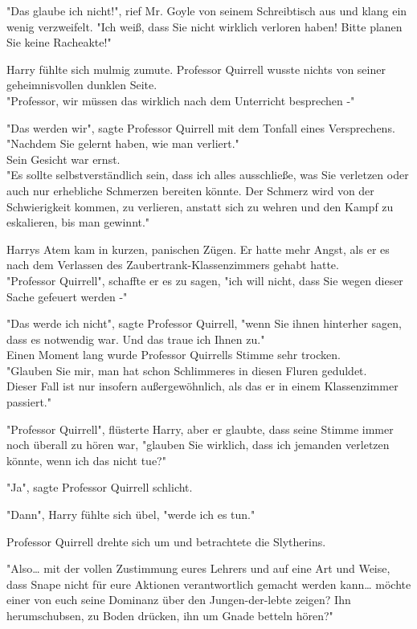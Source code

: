 {"Das glaube ich nicht!", rief Mr. Goyle von seinem Schreibtisch aus und klang ein wenig verzweifelt. "Ich weiß, dass Sie nicht wirklich verloren haben! Bitte planen Sie keine Racheakte!"

Harry fühlte sich mulmig zumute. Professor Quirrell wusste nichts von seiner geheimnisvollen dunklen Seite.\\ "Professor, wir müssen das wirklich nach dem Unterricht besprechen -"

"Das werden wir", sagte Professor Quirrell mit dem Tonfall eines Versprechens.\\ "Nachdem Sie gelernt haben, wie man verliert."\\ Sein Gesicht war ernst.\\ "Es sollte selbstverständlich sein, dass ich alles ausschließe, was Sie verletzen oder auch nur erhebliche Schmerzen bereiten könnte. Der Schmerz wird von der Schwierigkeit kommen, zu verlieren, anstatt sich zu wehren und den Kampf zu eskalieren, bis man gewinnt."

Harrys Atem kam in kurzen, panischen Zügen. Er hatte mehr Angst, als er es nach dem Verlassen des Zaubertrank-Klassenzimmers gehabt hatte.\\ "Professor Quirrell", schaffte er es zu sagen, "ich will nicht, dass Sie wegen dieser Sache gefeuert werden -"

"Das werde ich nicht", sagte Professor Quirrell, "wenn Sie ihnen hinterher sagen, dass es notwendig war. Und das traue ich Ihnen zu."\\ Einen Moment lang wurde Professor Quirrells Stimme sehr trocken.\\ "Glauben Sie mir, man hat schon Schlimmeres in diesen Fluren geduldet.\\ Dieser Fall ist nur insofern außergewöhnlich, als das er in einem Klassenzimmer passiert."

"Professor Quirrell", flüsterte Harry, aber er glaubte, dass seine Stimme immer noch überall zu hören war, "glauben Sie wirklich, dass ich jemanden verletzen könnte, wenn ich das nicht tue?"

"Ja", sagte Professor Quirrell schlicht.

"Dann", Harry fühlte sich übel, "werde ich es tun."

Professor Quirrell drehte sich um und betrachtete die Slytherins.

"Also… mit der vollen Zustimmung eures Lehrers und auf eine Art und Weise, dass Snape nicht für eure Aktionen verantwortlich gemacht werden kann… möchte einer von euch seine Dominanz über den Jungen-der-lebte zeigen? Ihn herumschubsen, zu Boden drücken, ihn um Gnade betteln hören?"

}

